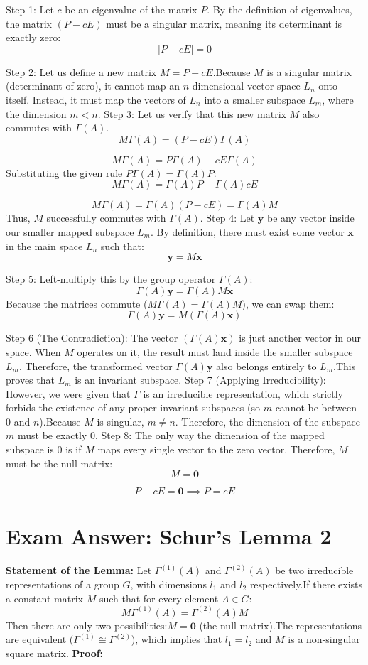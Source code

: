 \documentclass[11pt, a4paper]{report}
\begin{document}
Step 1:
 Let $c$ be an eigenvalue of the matrix $P$. By the definition of eigenvalues, the matrix $(P - cE)$ must be a singular matrix, meaning its determinant is exactly zero:
\[
|P - cE| = 0
\]

Step 2:
 Let us define a new matrix $M = P - cE$.Because $M$ is a singular matrix (determinant of zero), it cannot map an $n$-dimensional vector space $L_n$ onto itself. Instead, it must map the vectors of $L_n$ into a smaller subspace $L_m$, where the dimension $m < n$.
Step 3:
 Let us verify that this new matrix $M$ also commutes with $\Gamma(A)$.
\[
M \Gamma(A) = (P - cE) \Gamma(A)
\]

\[
M \Gamma(A) = P \Gamma(A) - cE \Gamma(A)
\]
Substituting the given rule $P \Gamma(A) = \Gamma(A) P$:
\[
M \Gamma(A) = \Gamma(A) P - \Gamma(A) cE
\]

\[
M \Gamma(A) = \Gamma(A) (P - cE) = \Gamma(A) M
\]
Thus, $M$ successfully commutes with $\Gamma(A)$.
Step 4:
 Let $\mathbf{y}$ be any vector inside our smaller mapped subspace $L_m$. By definition, there must exist some vector $\mathbf{x}$ in the main space $L_n$ such that:
\[
\mathbf{y} = M \mathbf{x}
\]

Step 5:
 Left-multiply this by the group operator $\Gamma(A)$:
\[
\Gamma(A) \mathbf{y} = \Gamma(A) M \mathbf{x}
\]
Because the matrices commute ($M\Gamma(A) = \Gamma(A)M$), we can swap them:
\[
\Gamma(A) \mathbf{y} = M (\Gamma(A) \mathbf{x})
\]

Step 6 (The Contradiction):
 The vector $(\Gamma(A)\mathbf{x})$ is just another vector in our space. When $M$ operates on it, the result must land inside the smaller subspace $L_m$. Therefore, the transformed vector $\Gamma(A)\mathbf{y}$ also belongs entirely to $L_m$.This proves that $L_m$ is an invariant subspace.
Step 7 (Applying Irreducibility):
However, we were given that $\Gamma$ is an irreducible representation, which strictly forbids the existence of any proper invariant subspaces (so $m$ cannot be between $0$ and $n$).Because $M$ is singular, $m \neq n$. Therefore, the dimension of the subspace $m$ must be exactly $0$.
Step 8:
 The only way the dimension of the mapped subspace is $0$ is if $M$ maps every single vector to the zero vector. Therefore, $M$ must be the null matrix:
\[
M = \mathbf{0}
\]

\[
P - cE = \mathbf{0} \implies P = cE
\]
\newpage

\chapter*{Exam Answer: Schur's Lemma 2}
\textbf{Statement of the Lemma:}
Let $\Gamma^{(1)}(A)$ and $\Gamma^{(2)}(A)$ be two irreducible representations of a group $G$, with dimensions $l_1$ and $l_2$ respectively.If there exists a constant matrix $M$ such that for every element $A \in G$:
\[
M \Gamma^{(1)}(A) = \Gamma^{(2)}(A) M
\]
Then there are only two possibilities:$M = \mathbf{0}$ (the null matrix).The representations are equivalent ($\Gamma^{(1)} \cong \Gamma^{(2)}$), which implies that $l_1 = l_2$ and $M$ is a non-singular square matrix.
\textbf{Proof:}
\end{document}
